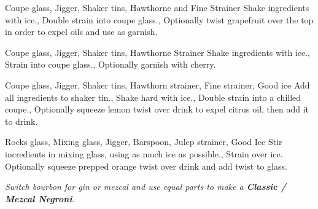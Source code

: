 \documentclass[../main.tex]{subfiles}
\begin{document}


{Coupe glass, Jigger, Shaker tins, Hawthorne and Fine Strainer}
{
    {Shake ingredients with ice.},
    {Double strain into coupe glass.},
    {Optionally twist grapefruit over the top in order to expel oils and use as garnish.}
}

\cocktailDivider

{Coupe glass, Jigger, Shaker tins, Hawthorne Strainer}
{
    {Shake ingredients with ice.},
    {Strain into coupe glass.},
    {Optionally garnish with cherry.}
}

\cocktailDivider

{Coupe glass, Jigger, Shaker tins, Hawthorn strainer, Fine strainer, Good ice}
{
    Add all ingredients to shaker tin.,
    {Shake hard with ice.},
    {Double strain into a chilled coupe.},
    {Optionally squeeze lemon twist over drink to expel citrus oil, then add it to drink.}
}

\cocktailDivider

{Rocks glass, Mixing glass, Jigger, Barspoon, Julep strainer, Good Ice}
{
    {Stir incredients in mixing glass, using as much ice as possible.},
    {Strain over ice. Optionally squeeze prepped orange twist over drink and add twist to glass.}
}

\begin{center}
    \textit{Switch bourbon for gin or mezcal and use equal parts to make a \textbf{Classic / Mezcal Negroni}.}
\end{center}
\end{document}
